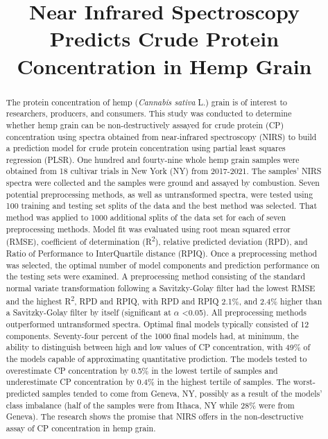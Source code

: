 \documentclass[
]{agujournal2019}
\begin{document}
\title{Near Infrared Spectroscopy Predicts Crude Protein Concentration
in Hemp Grain}



\begin{abstract}
The protein concentration of hemp (\emph{Cannabis sativa} L.) grain is
of interest to researchers, producers, and consumers. This study was
conducted to determine whether hemp grain can be non-destructively
assayed for crude protein (CP) concentration using spectra obtained from
near-infrared spectroscopy (NIRS) to build a prediction model for crude
protein concentration using partial least squares regression (PLSR). One
hundred and fourty-nine whole hemp grain samples were obtained from 18
cultivar trials in New York (NY) from 2017-2021. The samples' NIRS
spectra were collected and the samples were ground and assayed by
combustion. Seven potential preprocessing methods, as well as
untransformed spectra, were tested using 100 training and testing set
splits of the data and the best method was selected. That method was
applied to 1000 additional splits of the data set for each of seven
preprocessing methods. Model fit was evaluated using root mean squared
error (RMSE), coefficient of determination (R\textsuperscript{2}),
relative predicted deviation (RPD), and Ratio of Performance to
InterQuartile distance (RPIQ). Once a preprocessing method was selected,
the optimal number of model components and prediction performance on the
testing sets were examined. A preprocessing method consisting of the
standard normal variate transformation following a Savitzky-Golay filter
had the lowest RMSE and the highest R\textsuperscript{2}, RPD and RPIQ,
with RPD and RPIQ 2.1\%, and 2.4\% higher than a Savitzky-Golay filter
by itself (significant at \(\alpha\) \textless0.05). All preprocessing
methods outperformed untransformed spectra. Optimal final models
typically consisted of 12 components. Seventy-four percent of the 1000
final models had, at minimum, the ability to distinguish between high
and low values of CP concentration, with 49\% of the models capable of
approximating quantitative prodiction. The models tested to overestimate
CP concentration by 0.5\% in the lowest tertile of samples and
underestimate CP concentration by 0.4\% in the highest tertile of
samples. The worst-predicted samples tended to come from Geneva, NY,
possibly as a result of the models' class imbalance (half of the samples
were from Ithaca, NY while 28\% were from Geneva). The research shows
the promise that NIRS offers in the non-desctructive assay of CP
concentration in hemp grain.
\end{abstract}
\end{document}
